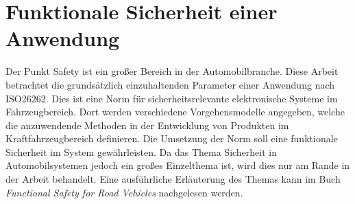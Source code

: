 \section{Funktionale Sicherheit einer Anwendung}
Der Punkt Safety ist ein großer Bereich in der Automobilbranche. Diese Arbeit betrachtet die grundsätzlich einzuhaltenden Parameter einer Anwendung nach ISO26262\cite{ISO26262}. Dies ist eine Norm für sicherheitsrelevante elektronische Systeme im Fahrzeugbereich. Dort werden verschiedene Vorgehensmodelle angegeben, welche die anzuwendende Methoden in der Entwicklung von Produkten im Kraftfahrzeugbereich definieren. Die Umsetzung der Norm soll eine funktionale Sicherheit im System gewährleisten. Da das Thema Sicherheit in Automobilsystemen jedoch ein großes Einzelthema ist, wird dies nur am Rande in der Arbeit behandelt. Eine ausführliche Erläuterung  des Themas kann im Buch \emph{Functional Safety for Road Vehicles} \cite{FunctionalSafety} nachgelesen werden.
